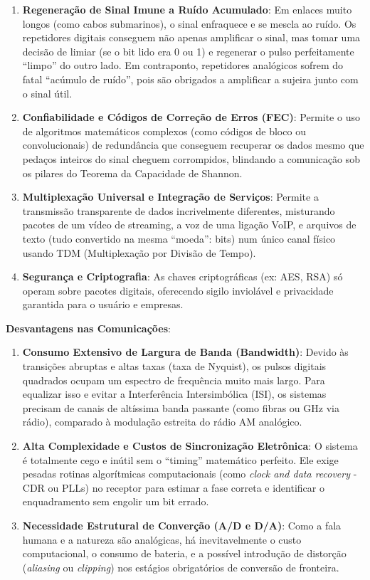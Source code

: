 \begin{enumerate}
\def\labelenumi{\arabic{enumi}.}
\tightlist
\item
  \textbf{Regeneração de Sinal Imune a Ruído Acumulado}: Em enlaces muito longos (como cabos submarinos), o sinal enfraquece e se mescla ao ruído. Os repetidores digitais conseguem não apenas amplificar o sinal, mas tomar uma decisão de limiar (se o bit lido era 0 ou 1) e regenerar o pulso perfeitamente ``limpo'' do outro lado. Em contraponto, repetidores analógicos sofrem do fatal ``acúmulo de ruído'', pois são obrigados a amplificar a sujeira junto com o sinal útil.
\item
  \textbf{Confiabilidade e Códigos de Correção de Erros (FEC)}: Permite o uso de algoritmos matemáticos complexos (como códigos de bloco ou convolucionais) de redundância que conseguem recuperar os dados mesmo que pedaços inteiros do sinal cheguem corrompidos, blindando a comunicação sob os pilares do Teorema da Capacidade de Shannon.
\item
  \textbf{Multiplexação Universal e Integração de Serviços}: Permite a transmissão transparente de dados incrivelmente diferentes, misturando pacotes de um vídeo de streaming, a voz de uma ligação VoIP, e arquivos de texto (tudo convertido na mesma ``moeda'': bits) num único canal físico usando TDM (Multiplexação por Divisão de Tempo).
\item
  \textbf{Segurança e Criptografia}: As chaves criptográficas (ex: AES, RSA) só operam sobre pacotes digitais, oferecendo sigilo inviolável e privacidade garantida para o usuário e empresas.
\end{enumerate}

\textbf{Desvantagens nas Comunicações}:

\begin{enumerate}
\def\labelenumi{\arabic{enumi}.}
\tightlist
\item
  \textbf{Consumo Extensivo de Largura de Banda (Bandwidth)}: Devido às transições abruptas e altas taxas (taxa de Nyquist), os pulsos digitais quadrados ocupam um espectro de frequência muito mais largo. Para equalizar isso e evitar a Interferência Intersimbólica (ISI), os sistemas precisam de canais de altíssima banda passante (como fibras ou GHz via rádio), comparado à modulação estreita do rádio AM analógico.
\item
  \textbf{Alta Complexidade e Custos de Sincronização Eletrônica}: O sistema é totalmente cego e inútil sem o ``timing'' matemático perfeito. Ele exige pesadas rotinas algorítmicas computacionais (como \emph{clock and data recovery} - CDR ou PLLs) no receptor para estimar a fase correta e identificar o enquadramento sem engolir um bit errado.
\item
  \textbf{Necessidade Estrutural de Converção (A/D e D/A)}: Como a fala humana e a natureza são analógicas, há inevitavelmente o custo computacional, o consumo de bateria, e a possível introdução de distorção (\emph{aliasing} ou \emph{clipping}) nos estágios obrigatórios de conversão de fronteira.
\end{enumerate}

